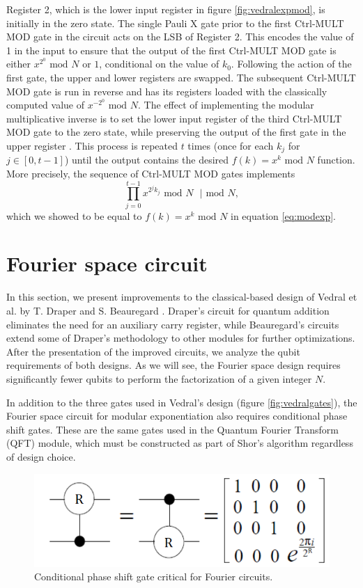 \documentclass{article}
\begin{document}
Register 2, which is the lower input register in figure \ref{fig:vedralexpmod}, is initially in the zero state. The single Pauli X gate prior to the first Ctrl-MULT MOD gate in the circuit acts on the LSB of Register 2. This encodes the value of 1 in the input to ensure that the output of the first Ctrl-MULT MOD gate is either $x^{2^0} \text{ mod }N$ or $1$, conditional on the value of $k_0$. Following the action of the first gate, the upper and lower registers are swapped. The subsequent Ctrl-MULT MOD gate is run in reverse and has its registers loaded with the classically computed value of $x^{-2^0} \text{ mod }N$. The effect of implementing the modular multiplicative inverse is to set the lower input register of the third Ctrl-MULT MOD gate to the zero state, while preserving the output of the first gate in the upper register \cite{VBE95}. This process is repeated $t$ times (once for each $k_j$ for $j\in [0, t-1]$) until the output contains the desired $f(k) = x^k \text{ mod } N$ function. More precisely, the sequence of Ctrl-MULT MOD gates implements 
\begin{equation*}
\prod_{j=0}^{t-1} x^{2^j k_j} \text{ mod }N \text{  } | \text{  mod }N,
\end{equation*}
which we showed to be equal to $f(k) = x^k \text{ mod }N$ in equation \eqref{eq:modexp}.


\section{Fourier space circuit}
\label{sec:BeauregardSec}
In this section, we present improvements to the classical-based design of Vedral et al. by T. Draper \cite{Dra00} and S. Beauregard \cite{Bea03}. Draper's circuit for quantum addition eliminates the need for an auxiliary carry register, while Beauregard's circuits extend some of Draper's methodology to other modules for further optimizations. After the presentation of the improved circuits, we analyze the qubit requirements of both designs. As we will see, the Fourier space design requires significantly fewer qubits to perform the factorization of a given integer $N$.

In addition to the three gates used in Vedral's design (figure \ref{fig:vedralgates}), the Fourier space circuit for modular exponentiation also requires conditional phase shift gates. These are the same gates used in the Quantum Fourier Transform (QFT) module, which must be constructed as part of Shor's algorithm regardless of design choice. 
\begin{figure}[!htbp]
\centering
\includegraphics[width=1\textwidth]
{phaseshiftgate.png}
\captionsetup{format = hang}
\caption{Conditional phase shift gate critical for Fourier circuits.}
\label{fig:phaseshiftgate}
\end{figure}
\end{document}
